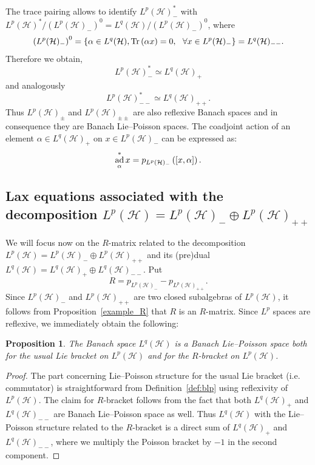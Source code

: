 \documentclass[a4paper,12pt,reqno]{amsart}%
\newtheorem{proposition}[theorem]{Proposition}
\theoremstyle{definition}
\theoremstyle{remark}
\numberwithin{theorem}{section}
\numberwithin{equation}{section}
\newcommand{\1}{{\bf 1}}
\DeclareMathOperator{\ad}{\textnormal{ad}}
\DeclareMathOperator{\Tr}{\textnormal{Tr}}
\begin{document}
The trace pairing allows to identify $L^p(\mathcal{H})_{-} ^*$ with $L^p(\mathcal{H})^*/ \left(L^p(\mathcal{H})_{-}\right)^0 =  L^{q}(\mathcal{H})/  \left(L^p(\mathcal{H})_{-}\right)^0$, where 
\[
\left(L^p(\mathcal{H})_{-}\right)^0 = \{\alpha \in L^{q}(\mathcal{H}), \Tr\left(\alpha x\right) = 0,~~\forall x\in L^p(\mathcal{H})_{-}\}
= L^{q}(\mathcal{H})_{--}.
\]
Therefore we obtain,
\begin{equation}\label{Lp+}
L^p(\mathcal{H})_{-} ^*\simeq L^{q}(\mathcal{H})_{+}
\end{equation}
and analogously
\begin{equation}
L^p(\mathcal{H})_{--} ^*\simeq L^{q}(\mathcal{H})_{++}.
\end{equation} 
Thus $L^p(\mathcal{H})_{\pm}$ and $L^p(\mathcal{H})_{\pm\pm}$ are also reflexive Banach spaces and in consequence they are Banach Lie--Poisson spaces. The coadjoint action of an element $\alpha\in L^{q}(\mathcal{H})_{+}$ on $x\in L^p(\mathcal{H})_{-}$ can be expressed as:
\begin{equation}\label{coad_trian}
\ad_{\alpha}^*x = p_{L^p(\mathcal{H})_{-}}\left([x, \alpha]\right).
\end{equation}


\subsection{Lax equations associated with the decomposition  \texorpdfstring{$L^p(\mathcal{H}) = L^p(\mathcal{H})_{-}\oplus L^p(\mathcal{H})_{++}$}{Lp(H) = Lp(H)- + Lp(H)++}}

We will focus now on the $R$-matrix related to the decomposition $L^p(\mathcal{H}) = L^p(\mathcal{H})_{-}\oplus L^p(\mathcal{H})_{++}$ and its (pre)dual $L^{q}(\mathcal{H}) = L^{q}(\mathcal{H})_{+} \oplus L^{q}(\mathcal{H})_{--}$. Put
\[
R = p_{L^p(\mathcal{H})_{-}} - p_{L^p(\mathcal{H})_{++}}.
\]
Since $L^p(\mathcal{H})_{-}$ and $L^p(\mathcal{H})_{++}$ are two closed subalgebras of $L^p(\mathcal{H})$, it follows from Proposition~\ref{example_R} that $R$ is an $R$-matrix. Since $L^p$ spaces are reflexive, we immediately obtain the following:

\begin{proposition}
The Banach space $L^{q}(\mathcal{H})$ is a Banach Lie--Poisson space both for the usual Lie bracket on $L^{p}(\mathcal{H})$ and for the $R$-bracket on $L^{p}(\mathcal{H})$.
\end{proposition}
\begin{proof}
    The part concerning Lie--Poisson structure for the usual Lie bracket (i.e. commutator) is straightforward from Definition~\ref{def:blp} using reflexivity of $L^{p}(\mathcal{H})$. The claim for $R$-bracket follows from the fact that both $L^{q}(\mathcal{H})_+$ and $L^{q}(\mathcal{H})_{--}$ are Banach Lie--Poisson space as well. Thus $L^{q}(\mathcal{H})$ with the Lie--Poisson structure related to the $R$-bracket is a direct sum of $L^{q}(\mathcal{H})_+$ and $L^{q}(\mathcal{H})_{--}$, where we multiply the Poisson bracket by $-1$ in the second component.
\end{proof}
\end{document}
